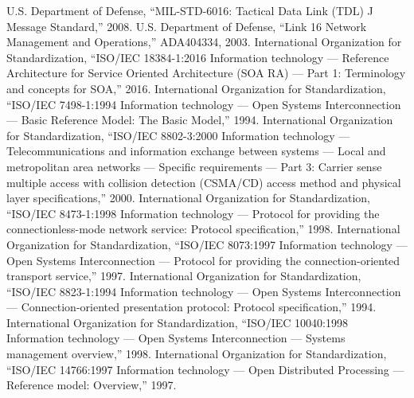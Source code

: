 \documentclass{article}
\begin{document}
\begin{thebibliography}{10}

 U.S. Department of Defense, ``MIL-STD-6016: Tactical Data Link (TDL) J Message Standard,'' 2008.
 U.S. Department of Defense, ``Link 16 Network Management and Operations,'' ADA404334, 2003.
 International Organization for Standardization, ``ISO/IEC 18384-1:2016 Information technology — Reference Architecture for Service Oriented Architecture (SOA RA) — Part 1: Terminology and concepts for SOA,'' 2016.
 International Organization for Standardization, ``ISO/IEC 7498-1:1994 Information technology — Open Systems Interconnection — Basic Reference Model: The Basic Model,'' 1994.
 International Organization for Standardization, ``ISO/IEC 8802-3:2000 Information technology — Telecommunications and information exchange between systems — Local and metropolitan area networks — Specific requirements — Part 3: Carrier sense multiple access with collision detection (CSMA/CD) access method and physical layer specifications,'' 2000.
 International Organization for Standardization, ``ISO/IEC 8473-1:1998 Information technology — Protocol for providing the connectionless-mode network service: Protocol specification,'' 1998.
 International Organization for Standardization, ``ISO/IEC 8073:1997 Information technology — Open Systems Interconnection — Protocol for providing the connection-oriented transport service,'' 1997.
 International Organization for Standardization, ``ISO/IEC 8823-1:1994 Information technology — Open Systems Interconnection — Connection-oriented presentation protocol: Protocol specification,'' 1994.
 International Organization for Standardization, ``ISO/IEC 10040:1998 Information technology — Open Systems Interconnection — Systems management overview,'' 1998.
 International Organization for Standardization, ``ISO/IEC 14766:1997 Information technology — Open Distributed Processing — Reference model: Overview,'' 1997.

\end{thebibliography}
\end{document}
